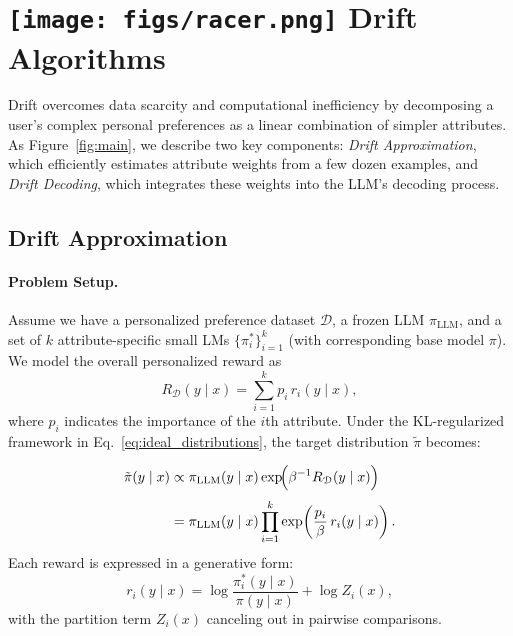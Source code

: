 \section{{\texttt{[image: figs/racer.png]}} Drift Algorithms}

Drift overcomes data scarcity and computational inefficiency by decomposing a user’s complex personal preferences as a linear combination of simpler attributes. As Figure~\ref{fig:main}, we describe two key components: \textit{Drift Approximation}, which efficiently estimates attribute weights from a few dozen examples, and \textit{Drift Decoding}, which integrates these weights into the LLM’s decoding process.

\subsection{Drift Approximation}
\paragraph{Problem Setup.} 
Assume we have a personalized preference dataset $\mathcal{D}$, a frozen LLM $\pi_\text{LLM}$, and a set of $k$ attribute-specific small LMs $\{\pi_i^*\}_{i=1}^k$ (with corresponding base model $\pi$). We model the overall personalized reward as
\begin{equation}
    R_{\mathcal{D}}(y \mid x) = \sum_{i=1}^k p_i \, r_i(y \mid x),
\end{equation}
where $p_i$ indicates the importance of the $i$th attribute. Under the KL-regularized framework in Eq.~\ref{eq:ideal_distributions}, the target distribution $\tilde{\pi}$ becomes:

{\small
\begin{equation}
\begin{split}
    \tilde{\pi}(y \mid x) &\propto \pi_\text{LLM}(y \mid x) \exp\!\Bigl(\beta^{-1}R_{\mathcal{D}}(y \mid x)\Bigr)\\[1mm]
    &= \pi_\text{LLM}(y \mid x) \prod_{i=1}^k \exp\!\left(\frac{p_i}{\beta} \, r_i(y \mid x)\right).
    \label{eq:combined_distribution}
\end{split}
\end{equation}}
\noindent
Each reward is expressed in a generative form:
\begin{equation}
    r_i(y \mid x) = \log\!\frac{\pi_i^*(y \mid x)}{\pi(y \mid x)} + \log Z_i(x),
    \label{eq:attribute_reward}
\end{equation}
with the partition term $Z_i(x)$ canceling out in pairwise comparisons.

